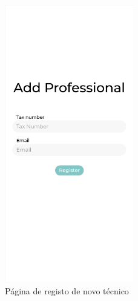 \begin{figure}[htb]
    \centering
    \includegraphics[width=0.5\textwidth]{images/mockups/account_registering.png}
    \caption{Página de registo de novo técnico}
    \label{fig:33}
\end{figure}